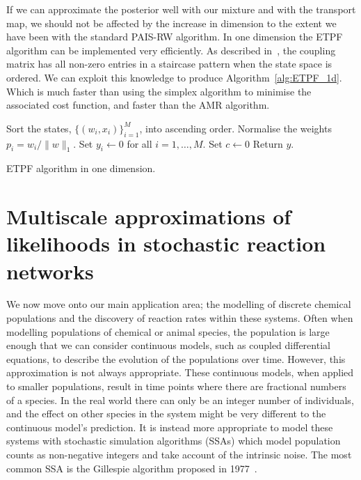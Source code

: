 \documentclass[final]{siamltex}
\begin{document}
If we can approximate the posterior well with our mixture and with the transport map, we should not be affected by the increase in dimension to the extent we have been with the standard PAIS-RW algorithm. In one dimension the ETPF algorithm can be implemented very efficiently. As described in~\cite{reich2013nonparametric}, the coupling matrix has all non-zero entries in a staircase pattern when the state space is ordered. We can exploit this knowledge to produce Algorithm~\ref{alg:ETPF_1d}. Which is much faster than using the simplex algorithm to minimise the associated cost function, and faster than the AMR algorithm.

\begin{table}
\begin{algorithm}[H]
\DontPrintSemicolon
\BlankLine
Sort the states, $\{(w_i, x_i)\}_{i=1}^M$, into ascending order.\;
Normalise the weights $p_i = w_i/\|w\|_1$.\;
Set $y_i \leftarrow 0$ for all $i=1,\dots,M$.\;
Set $c \leftarrow 0$\;
Return $y$.\;
\caption{ETPF algorithm in one dimension.\label{alg:ETPF_1d}}
\end{algorithm}
\end{table}


\section{Multiscale approximations of likelihoods in stochastic
  reaction networks}\label{sec:multi}

We now move onto our main application area; the modelling of discrete chemical populations and the discovery of reaction rates within these systems. Often when modelling populations of chemical or animal species, the population is large enough that we can consider continuous models, such as coupled differential equations, to describe the evolution of the populations over time. However, this approximation is not always appropriate. These continuous models, when applied to smaller populations, result in time points where there are fractional numbers of a species. In the real world there can only be an integer number of individuals, and the effect on other species in the system might be very different to the continuous model's prediction. It is instead more appropriate to model these systems with stochastic simulation algorithms (SSAs) which model population counts as non-negative integers and take account of the intrinsic noise. The most common SSA is the Gillespie algorithm proposed in 1977~\cite{gillespie1977exact}.
\end{document}
